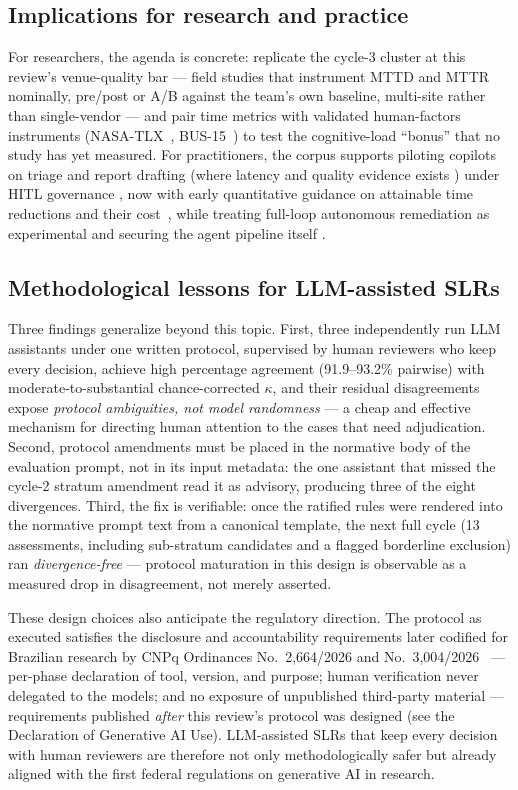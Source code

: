 \documentclass{ieeeaccess}
\begin{document}
\subsection{Implications for research and practice}
For researchers, the agenda is concrete: replicate the cycle-3 cluster
at this review's venue-quality bar --- field studies that instrument
MTTD and MTTR nominally, pre/post or A/B against the team's own
baseline, multi-site rather than single-vendor
\cite{P100,P101,P102,P123} --- and pair time metrics with validated
human-factors instruments (NASA-TLX~\cite{P69}, BUS-15~\cite{P63}) to
test the cognitive-load ``bonus'' that no study has yet measured. For
practitioners, the corpus supports piloting copilots on triage and
report drafting (where latency and quality evidence exists
\cite{P83,P87,P119}) under HITL governance \cite{P08,P37}, now with
early quantitative guidance on attainable time reductions and their
cost~\cite{P100,P101}, while treating full-loop autonomous remediation
as experimental \cite{P22,P76,P123} and securing the agent pipeline
itself \cite{P94}.

\subsection{Methodological lessons for LLM-assisted SLRs}
Three findings generalize beyond this topic. First, three
independently run LLM assistants under one written protocol, supervised
by human reviewers who keep every decision, achieve high percentage
agreement (91.9--93.2\% pairwise) with moderate-to-substantial
chance-corrected $\kappa$, and their residual disagreements expose
\emph{protocol ambiguities, not model randomness} --- a cheap and
effective mechanism for directing human attention to the cases that
need adjudication. Second, protocol amendments must be placed in
the normative body of the evaluation prompt, not in its input metadata:
the one assistant that missed the cycle-2 stratum amendment read it as
advisory, producing three of the eight divergences. Third, the fix is
verifiable: once the ratified rules were rendered into the normative
prompt text from a canonical template, the next full cycle (13
assessments, including sub-stratum candidates and a flagged borderline
exclusion) ran \emph{divergence-free} --- protocol maturation in this
design is observable as a measured drop in disagreement, not merely
asserted.

These design choices also anticipate the regulatory direction. The
protocol as executed satisfies the disclosure and accountability
requirements later codified for Brazilian research by CNPq Ordinances
No.~2{,}664/2026 and No.~3{,}004/2026~\cite{cnpq2664,cnpq3004} ---
per-phase declaration of tool, version, and purpose; human verification
never delegated to the models; and no exposure of unpublished
third-party material --- requirements published \emph{after} this
review's protocol was designed (see the Declaration of Generative AI
Use). LLM-assisted SLRs that keep every decision with human reviewers
are therefore not only methodologically safer but already aligned with
the first federal regulations on generative AI in research.
\end{document}
